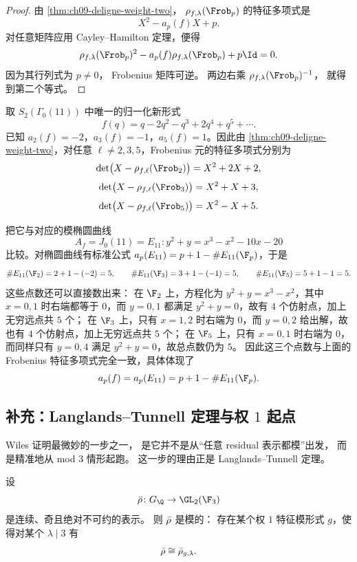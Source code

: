 \begin{proof}
由 \cref{thm:ch09-deligne-weight-two}，
$\rho_{f,\lambda}(\Frob_p)$ 的特征多项式是
\[
  X^2-a_p(f)X+p.
\]
对任意矩阵应用 Cayley--Hamilton 定理，便得
\[
  \rho_{f,\lambda}(\Frob_p)^2-a_p(f)\rho_{f,\lambda}(\Frob_p)+p\Id=0.
\]
因为其行列式为 $p\neq 0$，
Frobenius 矩阵可逆。
两边右乘 $\rho_{f,\lambda}(\Frob_p)^{-1}$，
就得到第二个等式。
\end{proof}

\begin{example}
\label{ex:ch09-level11-frobenius}
取 $S_2(\Gamma_0(11))$ 中唯一的归一化新形式
\[
f(q)=q-2q^2-q^3+2q^4+q^5+\cdots.
\]
已知 $a_2(f)=-2$，$a_3(f)=-1$，$a_5(f)=1$。因此由 \cref{thm:ch09-deligne-weight-two}，对任意 $\ell\neq 2,3,5$，Frobenius 元的特征多项式分别为
\[
\det\bigl(X-\rho_{f,\ell}(\Frob_2)\bigr)=X^2+2X+2,
\]
\[
\det\bigl(X-\rho_{f,\ell}(\Frob_3)\bigr)=X^2+X+3,
\]
\[
\det\bigl(X-\rho_{f,\ell}(\Frob_5)\bigr)=X^2-X+5.
\]

把它与对应的模椭圆曲线
\[
A_f=J_0(11)=E_{11}\colon y^2+y=x^3-x^2-10x-20
\]
比较。对椭圆曲线有标准公式 $a_p(E_{11})=p+1-\#E_{11}(\F_p)$，于是
\[
\#E_{11}(\F_2)=2+1-(-2)=5,\qquad
\#E_{11}(\F_3)=3+1-(-1)=5,\qquad
\#E_{11}(\F_5)=5+1-1=5.
\]
这些点数还可以直接数出来：
在 $\F_2$ 上，方程化为 $y^2+y=x^3-x^2$，其中 $x=0,1$ 时右端都等于 $0$，而 $y=0,1$ 都满足 $y^2+y=0$，故有 $4$ 个仿射点，加上无穷远点共 $5$ 个；
在 $\F_3$ 上，只有 $x=1,2$ 时右端为 $0$，而 $y=0,2$ 给出解，故也有 $4$ 个仿射点，加上无穷远点共 $5$ 个；
在 $\F_5$ 上，只有 $x=0,1$ 时右端为 $0$，而同样只有 $y=0,4$ 满足 $y^2+y=0$，故总点数仍为 $5$。
因此这三个点数与上面的 Frobenius 特征多项式完全一致，具体体现了
\[
a_p(f)=a_p(E_{11})=p+1-\#E_{11}(\F_p).
\]
\end{example}

\subsection*{补充：Langlands--Tunnell 定理与权 $1$ 起点}
Wiles 证明最微妙的一步之一，
是它并不是从“任意 residual 表示都模”出发，
而是精准地从 mod $3$ 情形起跑。
这一步的理由正是 Langlands--Tunnell 定理。

\begin{theorem}
\label{thm:ch09-langlands-tunnell}
设
\[
  \rhobar\colon G_\Q\to \GL_2(\F_3)
\]
是连续、奇且绝对不可约的表示。
则 $\bar{\rho}$ 是模的：
存在某个权 $1$ 特征模形式 $g$，使得对某个 $\lambda\mid 3$ 有
\[
  \bar{\rho}\cong \bar{\rho}_{g,\lambda}.
\]
\end{theorem}

